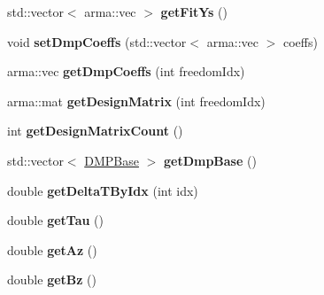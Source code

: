 \begin{DoxyCompactItemize}
\item 
\hypertarget{classkukadu_1_1Dmp_aa9074177aa8d7272d83456cf9aafde4c}{std\-::vector$<$ arma\-::vec $>$ {\bfseries get\-Fit\-Ys} ()}\label{classkukadu_1_1Dmp_aa9074177aa8d7272d83456cf9aafde4c}

\item 
\hypertarget{classkukadu_1_1Dmp_a6feb8dc33dc6b8b6cd032fa3b234dec0}{void {\bfseries set\-Dmp\-Coeffs} (std\-::vector$<$ arma\-::vec $>$ coeffs)}\label{classkukadu_1_1Dmp_a6feb8dc33dc6b8b6cd032fa3b234dec0}

\item 
\hypertarget{classkukadu_1_1Dmp_acf8b80c2993b1588d5aeab638480222d}{arma\-::vec {\bfseries get\-Dmp\-Coeffs} (int freedom\-Idx)}\label{classkukadu_1_1Dmp_acf8b80c2993b1588d5aeab638480222d}

\item 
\hypertarget{classkukadu_1_1Dmp_ad8cbaf545f773e2b347521c4d4f81972}{arma\-::mat {\bfseries get\-Design\-Matrix} (int freedom\-Idx)}\label{classkukadu_1_1Dmp_ad8cbaf545f773e2b347521c4d4f81972}

\item 
\hypertarget{classkukadu_1_1Dmp_aaa2bbfc5b9683d38c7dc3cae4fd66d35}{int {\bfseries get\-Design\-Matrix\-Count} ()}\label{classkukadu_1_1Dmp_aaa2bbfc5b9683d38c7dc3cae4fd66d35}

\item 
\hypertarget{classkukadu_1_1Dmp_a22ef512c5a0fb56808212c18eeabb4f6}{std\-::vector$<$ \hyperlink{classkukadu_1_1DMPBase}{D\-M\-P\-Base} $>$ {\bfseries get\-Dmp\-Base} ()}\label{classkukadu_1_1Dmp_a22ef512c5a0fb56808212c18eeabb4f6}

\item 
\hypertarget{classkukadu_1_1Dmp_a1ec31b0b369dac93fe7b4913ab8863db}{double {\bfseries get\-Delta\-T\-By\-Idx} (int idx)}\label{classkukadu_1_1Dmp_a1ec31b0b369dac93fe7b4913ab8863db}

\item 
\hypertarget{classkukadu_1_1Dmp_a787076c787e247bc14c07e738617e5f6}{double {\bfseries get\-Tau} ()}\label{classkukadu_1_1Dmp_a787076c787e247bc14c07e738617e5f6}

\item 
\hypertarget{classkukadu_1_1Dmp_aaec08d60cac323f41ffdad60c0218ea9}{double {\bfseries get\-Az} ()}\label{classkukadu_1_1Dmp_aaec08d60cac323f41ffdad60c0218ea9}

\item 
\hypertarget{classkukadu_1_1Dmp_a25805f30ba5af184d2cb3f228d74bc47}{double {\bfseries get\-Bz} ()}\label{classkukadu_1_1Dmp_a25805f30ba5af184d2cb3f228d74bc47}


\end{DoxyCompactItemize}
